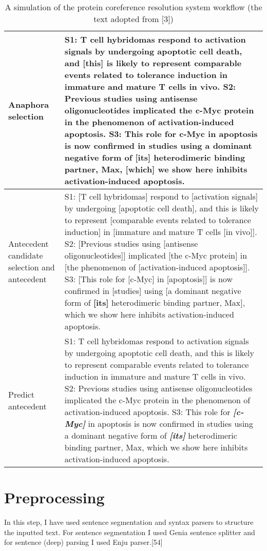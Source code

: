 \begin{table}
\begin{tabular}{ m{20mm} m{113mm} }
	\hline
	\footnotesize{Anaphora selection} & \footnotesize{S1: T cell hybridomas respond to activation signals by undergoing apoptotic cell death, and [this] is likely to represent comparable events related to tolerance induction in immature and mature T cells in vivo. S2: Previous studies using antisense oligonucleotides implicated the c-Myc protein in the phenomenon of activation-induced apoptosis. S3: This role for c-Myc in apoptosis is now confirmed in studies using a dominant negative form of [its] heterodimeric binding partner, Max, [which] we show here inhibits activation-induced apoptosis.}\\
	\hline
	\footnotesize{Antecedent candidate selection and antecedent}& \footnotesize{S1: [T cell hybridomas] respond to [activation signals] by undergoing [apoptotic cell death], and this is likely to represent [comparable events related to tolerance induction] in [immature and mature T cells [in vivo]]. S2: [Previous studies using [antisense oligonucleotides]] implicated [the c-Myc protein] in [the phenomenon of [activation-induced apoptosis]]. S3: [This role for [c-Myc] in [apoptosis]] is now confirmed in [studies] using [a dominant negative form of \textbf{[its]} heterodimeric binding partner, Max], which we show here inhibits activation-induced apoptosis.}\\
	\hline
	\footnotesize{Predict antecedent}&\footnotesize{S1: T cell hybridomas respond to activation signals by undergoing apoptotic cell death, and this is likely to represent comparable events related to tolerance induction in immature and mature T cells in vivo. S2: Previous studies using antisense oligonucleotides implicated the c-Myc protein in the phenomenon of activation-induced apoptosis. S3: This role for \emph{\textbf{[c-Myc]}} in apoptosis is now confirmed in studies using a dominant negative form of \emph{\textbf{[its]}} heterodimeric binding partner, Max, which we show here inhibits activation-induced apoptosis.}
  \end{tabular}
  \caption{A simulation of the protein coreference resolution system workflow (the text adopted from [3])}
\end{table}

\newpage
\section{Preprocessing}

In this step, I have used sentence segmentation and syntax parsers to structure the inputted text. For sentence segmentation I used Genia sentence splitter and for sentence (deep) parsing I used Enju parser.[54]

